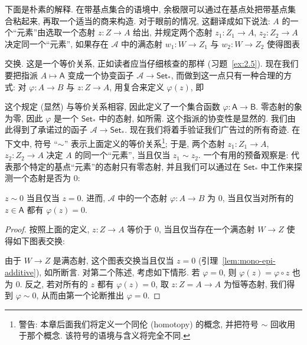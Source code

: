 \indent 下面是朴素的解释. 在带基点集合的语境中, 余极限可以通过在基点处把带基点集合粘起来, 再取一个适当的商来构造. 对于眼前的情况, 这翻译成如下说法: $A$ 的一个``元素''由选取一个态射 $z:Z\to A$ 给出, 并规定两个态射 $z_1:Z_1\to A$, $z_2:Z_2\to A$ 决定同一个``元素'', 如果存在 $\mathcal{A}$ 中的满态射 $w_1:W\to Z_1$ 与 $w_2:W\to Z_2$ 使得图表
\begin{center}
\end{center}
交换. 这是一个等价关系, 正如读者应当仔细核查的那样 (习题~\ref{ex:2.5}).
现在我们要把指派 $A\mapsto\mathsf{A}$ 变成一个协变函子 $\mathcal{A}\to\mathsf{Set}_*$, 而做到这一点只有一种合理的方式: 对 $\varphi:A\to B$ 与 $z:Z\to A$, 用复合来定义 $\varphi(z)$, 即
\begin{center}
\end{center}
这个规定 (显然) 与等价关系相容, 因此定义了一个集合函数 $\varphi:\mathsf{A}\to\mathsf{B}$. 零态射的象为零, 因此 $\varphi$ 是一个 $\mathsf{Set}_*$ 中的态射, 如所需. 这个指派的协变性是显然的. 我们由此得到了承诺过的函子 $\mathcal{A}\to\mathsf{Set}_*$.
现在我们将着手验证我们广告过的所有奇迹. 在下文中, 符号 ``$\sim$'' 表示上面定义的等价关系\footnote{警告: 本章后面我们将定义一个同伦 (homotopy) 的概念, 并把符号 $\sim$ 回收用于那个概念. 该符号的语境与含义将完全不同.}; 于是, 两个态射 $z_1:Z_1\to A$, $z_2:Z_2\to A$ 决定 $A$ 的同一个``元素'', 当且仅当 $z_1\sim z_2$.
一个有用的预备观察是: 代表那个特定的基点``元素''的态射只有零态射, 并且我们可以通过在 $\mathsf{Set}_*$ 中工作来探测一个态射是否为 $0$:

\begin{lemma}\label{lem:element-zero}
$z\sim 0$ 当且仅当 $z=0$. 进而, $\mathcal{A}$ 中的一个态射 $\varphi:A\to B$ 为 $0$, 当且仅当对所有的 $z\in\mathsf{A}$ 都有 $\varphi(z)=0$.
\end{lemma}

\begin{proof}
按照上面的定义, $z:Z\to A$ 等价于 $0$, 当且仅当存在一个满态射 $W\to Z$ 使得如下图表交换:
\begin{center}
\end{center}
由于 $W\to Z$ 是满态射, 这个图表交换当且仅当 $z=0$ (引理~\ref{lem:mono-epi-additive}), 如所断言.
对第二个陈述, 考虑如下情形. 若 $\varphi=0$, 则 $\varphi(z)=\varphi\circ z$ 也为 $0$. 反之, 若对所有的 $z$ 都有 $\varphi(z)=0$, 取 $z:Z=A\to A$ 为恒等态射, 我们得到 $\varphi\sim 0$, 从而由第一个论断推出 $\varphi=0$.
\end{proof}

